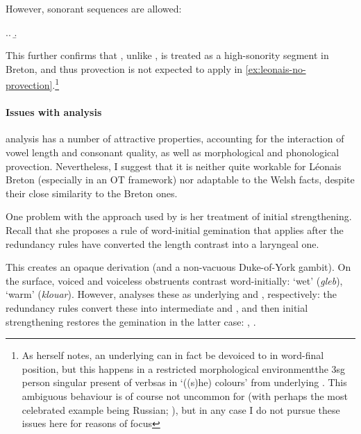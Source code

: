 However, \ipa{[v]}\endash sonorant sequences are allowed:

\ex.\a.
\b.

This further confirms that \ipa{[v]}, unlike \ipa{[f̬]}, is treated as a high\hyp sonority segment in Breton, and thus provection is not expected to apply in \cref{ex:leonais-no-provection}.\footnote{As \citet{carlyle88:_breton} herself notes, an underlying \ipa{[v]} can in fact be devoiced to \ipa{[f]} in word\hyp final position, but this happens in a restricted morphological environment\dash the 3sg person singular present of verbs\dash as in \ipa{[ˈliːf]} `((s)he) colours' from underlying . This ambiguous behaviour is of course not uncommon for \ipa{[v]} (with perhaps the most celebrated example being Russian; \eg \citealt{hayes84:_russian,kiparsky85:_some_lexic_phonol,padgett-vproblem}), but in any case I do not pursue these issues here for reasons of focus}

\paragraph{Issues with  analysis}
\label{sec:issues-with-analysis}

 analysis has a number of attractive properties, accounting for the interaction of vowel length and consonant quality, as well as morphological and phonological provection. Nevertheless, I suggest that it is neither quite workable for Léonais Breton (especially in an OT framework) nor adaptable to the Welsh facts, despite their close similarity to the Breton ones.

One problem with the approach used by \citet{carlyle88:_breton} is her treatment of initial strengthening. Recall that she proposes a rule of word\hyp initial gemination that applies after the redundancy rules have converted the length contrast into a laryngeal one.

This creates an opaque derivation (and a non\hyp vacuous Duke-of-York gambit). On the surface, voiced and voiceless obstruents contrast word\hyp initially: \ipa{[ˈɡleːp]} `wet' (\emph{gleb}), \ipa{[ˈkluːar]} `warm' (\emph{klouar}). However, \citet{carlyle88:_breton} analyses these as underlying  and , respectively: the redundancy rules convert these into intermediate  and , and then initial strengthening restores the gemination in the latter case: \ipa{[ˈɡːleːp]}, \ipa{[kːluːar]}.

